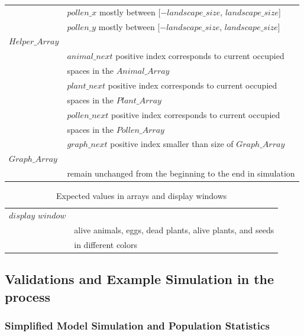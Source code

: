 \documentclass[3p,,preprint,12pt]{elsarticle}
\begin{document}
\begin{table} [!htb]
\begin{tabular}{ l l }
 & $pollen\_x$ mostly between [$-landscape\_size$, $landscape\_size$]\\
 & $pollen\_y$ mostly between [$-landscape\_size$, $landscape\_size$]\\
 $Helper\_Array$ & \\
 & $animal\_next$ positive index corresponds to current occupied \\
 & spaces in the $Animal\_Array$\\
 & $plant\_next$ positive index corresponds to current occupied \\
 & spaces in the $Plant\_Array$\\
 & $pollen\_next$ positive index corresponds to current occupied \\
 & spaces in the $Pollen\_Array$\\
 & $graph\_next$ positive index smaller than size of $Graph\_Array$\\
 $Graph\_Array$ & \\
 & remain unchanged from the beginning to the end in simulation\\
\end{tabular}
\end{table}

\pagebreak
\begin{table} [!htb]
\begin{tabular} { l l } 
 $display$ $window$ & \\
 & alive animals, eggs, dead plants, alive plants, and seeds \\
 & in different colors \\
\end{tabular}
\caption{\label{tab:table-name} Expected values in arrays and display windows}
\end{table}
\pagebreak

\subsection{\textbf{Validations and Example Simulation in the process}}
\subsubsection{Simplified Model Simulation and Population Statistics}
\end{document}
